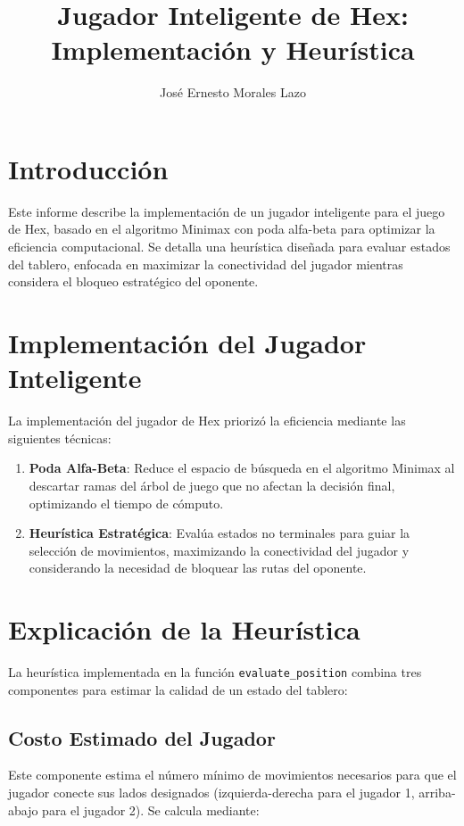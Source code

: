 \documentclass[a4paper,12pt]{article}
\title{Jugador Inteligente de Hex: Implementación y Heurística}
\author{José Ernesto Morales Lazo}
\date{}
\begin{document}
\maketitle

\section{Introducción}
Este informe describe la implementación de un jugador inteligente para el juego de Hex, basado en el algoritmo Minimax con poda alfa-beta para optimizar la eficiencia computacional. Se detalla una heurística diseñada para evaluar estados del tablero, enfocada en maximizar la conectividad del jugador mientras considera el bloqueo estratégico del oponente.

\section{Implementación del Jugador Inteligente}
La implementación del jugador de Hex priorizó la eficiencia mediante las siguientes técnicas:

\begin{enumerate}
    \item \textbf{Poda Alfa-Beta}: Reduce el espacio de búsqueda en el algoritmo Minimax al descartar ramas del árbol de juego que no afectan la decisión final, optimizando el tiempo de cómputo.
    \item \textbf{Heurística Estratégica}: Evalúa estados no terminales para guiar la selección de movimientos, maximizando la conectividad del jugador y considerando la necesidad de bloquear las rutas del oponente.
\end{enumerate}

\section{Explicación de la Heurística}
La heurística implementada en la función \texttt{evaluate\_position} combina tres componentes para estimar la calidad de un estado del tablero:

\subsection{Costo Estimado del Jugador}
Este componente estima el número mínimo de movimientos necesarios para que el jugador conecte sus lados designados (izquierda-derecha para el jugador 1, arriba-abajo para el jugador 2). Se calcula mediante:
\end{document}
